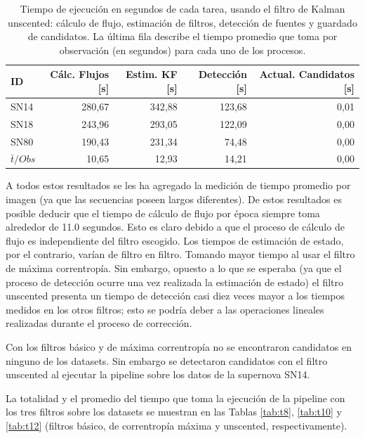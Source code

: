 \begin{table}[h!]
\centering
\caption{Tiempo de ejecuci\'on en segundos de cada tarea, usando el filtro de Kalman unscented: c\'alculo de flujo, estimaci\'on de filtros, detecci\'on de fuentes y guardado de candidatos. La \'ultima fila describe el tiempo promedio que toma por observaci\'on (en segundos) para cada uno de los procesos.}
\begin{tabular}{|l|r|r|r|r|}
\hline
\textbf{ID} & \textbf{C\'alc. Flujos [s]} & \textbf{Estim. KF [s]} &  \textbf{Detecci\'on [s]}  & \textbf{Actual. Candidatos [s]}\\ \hline \hline
SN14        & 280,67            & 342,88        &  123,68 & 0,01 \\ \hline
SN18            & 243,96             & 293,05         &  122,09  & 0,00\\ \hline
SN80            & 190,43             & 231,34         &   74,48 & 0,00 \\ \hline \hline
$\bar{t}/Obs$ & 10,65 &  12,93 & 14,21 & 0,00\\\hline 
\end{tabular}
\label{tab:t11}
\end{table}
A todos estos resultados se les ha agregado la medici\'on de tiempo promedio por imagen (ya que las secuencias poseen largos diferentes). De estos resultados es posible deducir que el tiempo de c\'alculo de flujo por \'epoca siempre toma alrededor de 11.0 segundos. Esto es claro debido a que el proceso de c\'alculo de flujo es independiente del filtro escogido. Los tiempos de estimaci\'on de estado, por el contrario, var\'ian de filtro en filtro. Tomando mayor tiempo al usar el filtro de m\'axima correntrop\'ia. Sin embargo, opuesto a lo que se esperaba (ya que el proceso de detecci\'on ocurre una vez realizada la estimaci\'on de estado) el filtro unscented presenta un tiempo de detecci\'on casi diez veces mayor a los tiempos medidos en los otros filtros; esto se podr\'ia deber a las operaciones lineales realizadas durante el proceso de correcci\'on. 
\bigskip

Con los filtros b\'asico y de m\'axima correntrop\'ia no se encontraron candidatos en ninguno de los datasets. Sin embargo se detectaron candidatos con el filtro unscented al ejecutar la pipeline sobre los datos de la supernova SN14.
\bigskip

La totalidad y el promedio del tiempo que toma la ejecuci\'on de la pipeline con los tres filtros sobre los datasets se muestran en las Tablas \ref{tab:t8},  \ref{tab:t10} y \ref{tab:t12} (filtros b\'asico, de correntrop\'ia m\'axima y unscented, respectivamente).
\bigskip

